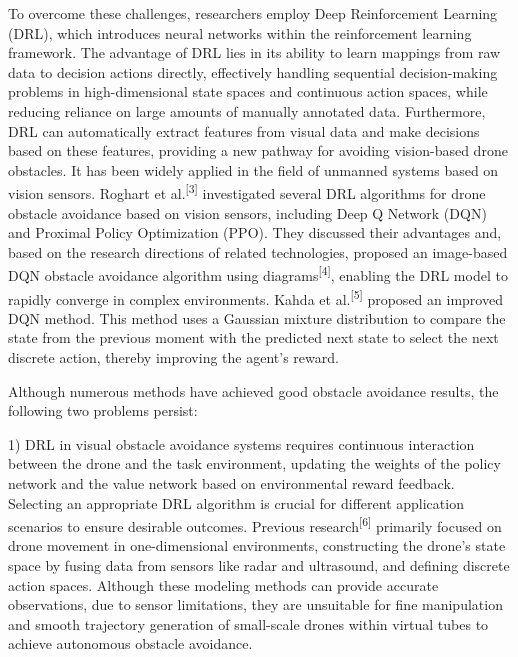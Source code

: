 \documentclass[preprint,12pt,authoryear]{elsarticle}
\begin{document}
To overcome these challenges, researchers employ Deep Reinforcement Learning (DRL), which introduces neural networks within the reinforcement learning framework. The advantage of DRL lies in its ability to learn mappings from raw data to decision actions directly, effectively handling sequential decision-making problems in high-dimensional state spaces and continuous action spaces, while reducing reliance on large amounts of manually annotated data. Furthermore, DRL can automatically extract features from visual data and make decisions based on these features, providing a new pathway for avoiding vision-based drone obstacles. It has been widely applied in the field of unmanned systems based on vision sensors. Roghart et al.\textsuperscript{[3]} investigated several DRL algorithms for drone obstacle avoidance based on vision sensors, including Deep Q Network (DQN) and Proximal Policy Optimization (PPO). They discussed their advantages and, based on the research directions of related technologies, proposed an image-based DQN obstacle avoidance algorithm using diagrams\textsuperscript{[4]}, enabling the DRL model to rapidly converge in complex environments. Kahda et al.\textsuperscript{[5]} proposed an improved DQN method. This method uses a Gaussian mixture distribution to compare the state from the previous moment with the predicted next state to select the next discrete action, thereby improving the agent's reward.

Although numerous methods have achieved good obstacle avoidance results, the following two problems persist:

1)  DRL in visual obstacle avoidance systems requires continuous interaction between the drone and the task environment, updating the weights of the policy network and the value network based on environmental reward feedback. Selecting an appropriate DRL algorithm is crucial for different application scenarios to ensure desirable outcomes. Previous research\textsuperscript{[6]} primarily focused on drone movement in one-dimensional environments, constructing the drone's state space by fusing data from sensors like radar and ultrasound, and defining discrete action spaces. Although these modeling methods can provide accurate observations, due to sensor limitations, they are unsuitable for fine manipulation and smooth trajectory generation of small-scale drones within virtual tubes to achieve autonomous obstacle avoidance.
\end{document}
